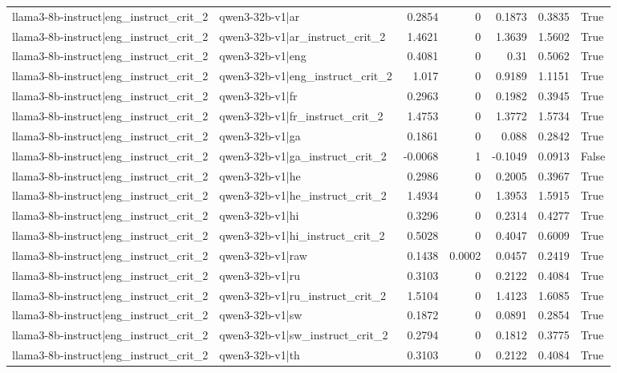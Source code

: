 \begin{table}
\begin{tabular}{l l r r r r l}
llama3-8b-instruct|eng_instruct_crit_2 & qwen3-32b-v1|ar & 0.2854 & 0 & 0.1873 & 0.3835 & True \\
llama3-8b-instruct|eng_instruct_crit_2 & qwen3-32b-v1|ar_instruct_crit_2 & 1.4621 & 0 & 1.3639 & 1.5602 & True \\
llama3-8b-instruct|eng_instruct_crit_2 & qwen3-32b-v1|eng & 0.4081 & 0 & 0.31 & 0.5062 & True \\
llama3-8b-instruct|eng_instruct_crit_2 & qwen3-32b-v1|eng_instruct_crit_2 & 1.017 & 0 & 0.9189 & 1.1151 & True \\
llama3-8b-instruct|eng_instruct_crit_2 & qwen3-32b-v1|fr & 0.2963 & 0 & 0.1982 & 0.3945 & True \\
llama3-8b-instruct|eng_instruct_crit_2 & qwen3-32b-v1|fr_instruct_crit_2 & 1.4753 & 0 & 1.3772 & 1.5734 & True \\
llama3-8b-instruct|eng_instruct_crit_2 & qwen3-32b-v1|ga & 0.1861 & 0 & 0.088 & 0.2842 & True \\
llama3-8b-instruct|eng_instruct_crit_2 & qwen3-32b-v1|ga_instruct_crit_2 & -0.0068 & 1 & -0.1049 & 0.0913 & False \\
llama3-8b-instruct|eng_instruct_crit_2 & qwen3-32b-v1|he & 0.2986 & 0 & 0.2005 & 0.3967 & True \\
llama3-8b-instruct|eng_instruct_crit_2 & qwen3-32b-v1|he_instruct_crit_2 & 1.4934 & 0 & 1.3953 & 1.5915 & True \\
llama3-8b-instruct|eng_instruct_crit_2 & qwen3-32b-v1|hi & 0.3296 & 0 & 0.2314 & 0.4277 & True \\
llama3-8b-instruct|eng_instruct_crit_2 & qwen3-32b-v1|hi_instruct_crit_2 & 0.5028 & 0 & 0.4047 & 0.6009 & True \\
llama3-8b-instruct|eng_instruct_crit_2 & qwen3-32b-v1|raw & 0.1438 & 0.0002 & 0.0457 & 0.2419 & True \\
llama3-8b-instruct|eng_instruct_crit_2 & qwen3-32b-v1|ru & 0.3103 & 0 & 0.2122 & 0.4084 & True \\
llama3-8b-instruct|eng_instruct_crit_2 & qwen3-32b-v1|ru_instruct_crit_2 & 1.5104 & 0 & 1.4123 & 1.6085 & True \\
llama3-8b-instruct|eng_instruct_crit_2 & qwen3-32b-v1|sw & 0.1872 & 0 & 0.0891 & 0.2854 & True \\
llama3-8b-instruct|eng_instruct_crit_2 & qwen3-32b-v1|sw_instruct_crit_2 & 0.2794 & 0 & 0.1812 & 0.3775 & True \\
llama3-8b-instruct|eng_instruct_crit_2 & qwen3-32b-v1|th & 0.3103 & 0 & 0.2122 & 0.4084 & True \\

\end{tabular}
\end{table}
